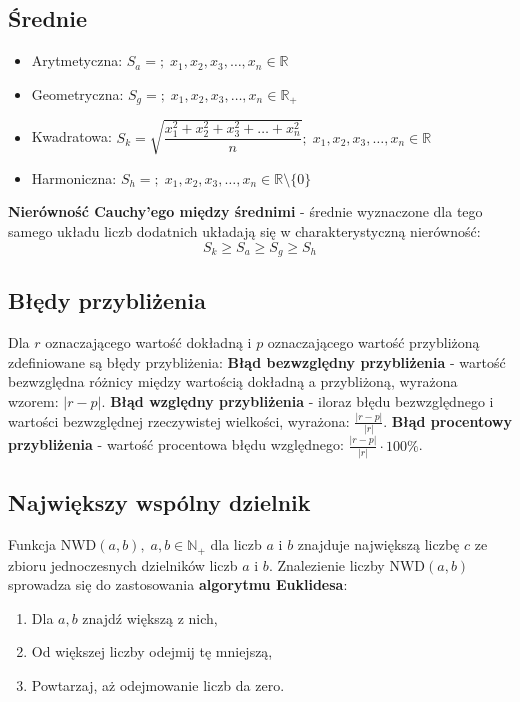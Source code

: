 \documentclass[14pt,a4paper]{extarticle}
\begin{document}
\noindent\subsection{Średnie}

\begin{itemize}
   \item Arytmetyczna: $S_{a} = $$;\; x_{1}, x_{2}, x_{3}, \ldots, x_{n} \in \mathbb{R}$
   \item Geometryczna: $S_{g} = $$;\; x_{1}, x_{2}, x_{3}, \ldots, x_{n} \in \mathbb{R}_{+}$
   \item Kwadratowa: $S_{k} = \sqrt{\dfrac{\displaystyle x_{1}^{2} + x_{2}^{2} + x_{3}^{2} + \ldots + x_{n}^{2}}{\displaystyle n}};\; x_{1}, x_{2}, x_{3}, \ldots, x_{n} \in \mathbb{R}$
   \item Harmoniczna: $S_{h} = $$;\; x_{1}, x_{2}, x_{3}, \ldots, x_{n} \in \mathbb{R} \!\setminus\!\{0\} $
\end{itemize}
\textbf{Nierówność Cauchy'ego między średnimi} - średnie wyznaczone dla tego samego układu liczb dodatnich układają się w charakterystyczną nierówność:
$$S_{k} \geq S_{a} \geq S_{g} \geq S_{h}$$

\newpage
\noindent\subsection{Błędy przybliżenia}
Dla $r$ oznaczającego wartość dokładną i $p$ oznaczającego wartość przybliżoną zdefiniowane są błędy przybliżenia:\hfill\break
\noindent\textbf{Błąd bezwzględny przybliżenia} - wartość bezwzględna różnicy między wartością dokładną a przybliżoną, wyrażona wzorem: $\vert r - p\vert$.\hfill\break
\textbf{Błąd względny przybliżenia} - iloraz błędu bezwzględnego i wartości bezwzględnej rzeczywistej wielkości, wyrażona: $\frac{\displaystyle\vert r - p\vert}{\displaystyle\vert r\vert}$.\hfill\break
\textbf{Błąd procentowy przybliżenia} - wartość procentowa błędu względnego: \hfill\break$\frac{\displaystyle\vert r - p\vert}{\displaystyle\vert r\vert} \cdot 100\%$.\\

\noindent\subsection{Największy wspólny dzielnik}
Funkcja $\text{NWD}(a, b),\;a, b \in \mathbb{N}_{+}$ dla liczb $a$ i $b$ znajduje największą liczbę $c$ ze zbioru
jednoczesnych dzielników liczb $a$ i $b$. Znalezienie liczby $\text{NWD}(a, b)$ sprowadza się do zastosowania \textbf{algorytmu Euklidesa}:
\begin{enumerate}
   \item Dla $a, b$ znajdź większą z nich,
   \item Od większej liczby odejmij tę mniejszą,
   \item Powtarzaj, aż odejmowanie liczb da zero.
\end{enumerate}
\end{document}

